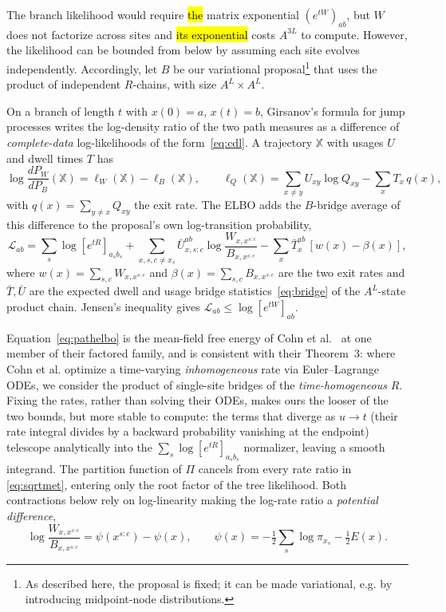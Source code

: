 \documentclass[11pt]{article}
\newcommand{\revised}[1]{\hl{#1}}   %
\begin{document}
The branch likelihood would require \revised{the} matrix exponential $(e^{tW})_{ab}$, but $W$ does not factorize across sites and \revised{its exponential} costs $A^{3L}$ to compute.
However, the likelihood can be bounded from below by assuming each site evolves independently.
Accordingly, let $B$ be our variational
proposal\footnote{
As described here, the proposal is fixed; it can be made variational, e.g. by introducing midpoint-node distributions.
}
that uses the product of independent $R$-chains, with size $A^L \times A^L$.

On a branch of length $t$ with $x(0)=a$, $x(t)=b$,
Girsanov's formula for jump processes writes the log-density ratio of the two path
measures as a difference of \emph{complete-data} log-likelihoods of the
form~\eqref{eq:cdl}.
A trajectory $\mathbb X$ with usages $U$ and dwell times $T$ has
\begin{equation}\label{eq:girsanov}
 \log\frac{d P_W}{d P_B}(\mathbb X)=\ell_W(\mathbb X)-\ell_B(\mathbb X),
 \qquad
 \ell_Q(\mathbb X)=\sum_{x\ne y}U_{xy}\log Q_{xy}-\sum_xT_x\,q(x),
\end{equation}
with $q(x)=\sum_{y\ne x}Q_{xy}$ the exit rate. The ELBO adds the $B$-bridge average of this
difference to the proposal's own log-transition probability,
\begin{equation}\label{eq:pathelbo}
 \mathcal L_{ab}=\sum_s\log[e^{tR}]_{a_sb_s}
 +\sum_{x,s,c\ne x_s}\bar U^{ab}_{x,s:c}\log\frac{W_{x,x^{s:c}}}{B_{x,x^{s:c}}}
 -\sum_x\bar T^{ab}_x\,[w(x)-\beta(x)],
\end{equation}
where $w(x)=\sum_{s,c}W_{x,x^{s:c}}$ and $\beta(x)=\sum_{s,c}B_{x,x^{s:c}}$ are the two exit rates
and $\bar T,\bar U$ are the expected dwell and usage bridge statistics~\eqref{eq:bridge} of the
$A^L$-state product chain. Jensen's inequality gives
$\mathcal L_{ab}\le\log[e^{tW}]_{ab}$.

Equation~\eqref{eq:pathelbo} is the mean-field free energy of Cohn et
al.~\citep{cohn2010} at one member of their factored family, and is consistent with their Theorem~3:
where Cohn et al. optimize a time-varying \emph{inhomogeneous} rate via Euler--Lagrange ODEs, we consider the product of single-site
bridges of the \emph{time-homogeneous} $R$. Fixing the rates, rather than
solving their ODEs, makes ours the looser of the two bounds, but more stable to compute: the terms that diverge as $u\to t$
(their rate integral divides by a backward probability vanishing at the endpoint)
telescope analytically into the $\sum_s\log[e^{tR}]_{a_sb_s}$ normalizer, leaving a smooth
integrand. The partition function of
$\Pi$ cancels from every rate ratio in \eqref{eq:sqrtmet}, entering only the root factor
of the tree likelihood. Both contractions below rely on log-linearity making the log-rate
ratio a \emph{potential difference},
\begin{equation}\label{eq:logWB}
 \log\frac{W_{x,x^{s:c}}}{B_{x,x^{s:c}}}=\psi(x^{s:c})-\psi(x),
 \qquad
 \psi(x)=-\tfrac12\sum_s\log\pi_{x_s}-\tfrac12E(x).
\end{equation}
\end{document}
